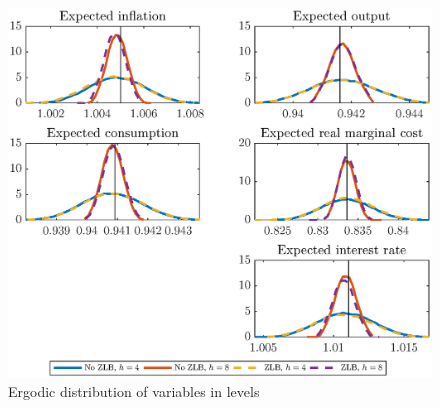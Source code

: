 \documentclass[12pt]{article}
\numberwithin{equation}{section}
\begin{document}
\begin{figure}[H]
	\centering
	\caption{Ergodic distribution of variables in levels}\label{fig:m3_distExp}
	\includegraphics[scale=0.7]{m3_distExp}
\end{figure}



	
\end{document}
